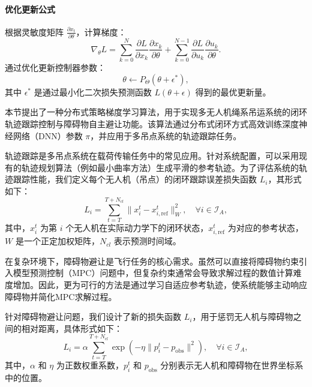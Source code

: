 \documentclass[lang=chs, degree=master, blindreview=false, winfonts=true]{yanputhesis}
\begin{document}
\paragraph{优化更新公式}  
根据灵敏度矩阵 $\frac{\partial x_t}{\partial \theta}$，计算梯度：
\begin{equation}
\nabla_\theta L = \sum_{k=0}^N \frac{\partial L}{\partial x_k} \frac{\partial x_k}{\partial \theta} + \sum_{k=0}^{N-1} \frac{\partial L}{\partial u_k} \frac{\partial u_k}{\partial \theta}.
\end{equation}
通过优化更新控制器参数：
\begin{equation}
\theta \leftarrow P_\Theta(\theta + \epsilon^*),
\end{equation}
其中 $\epsilon^*$ 是通过最小化二次损失预测函数 $L(\theta + \epsilon)$ 得到的最优更新量。

本节提出了一种分布式策略梯度学习算法，用于实现多无人机绳系吊运系统的闭环轨迹跟踪控制与障碍物自主避让功能。该算法通过分布式闭环方式高效训练深度神经网络（DNN）参数 $\pi$，并应用于多吊点系统的轨迹跟踪任务。

轨迹跟踪是多吊点系统在载荷传输任务中的常见应用。针对系统配置，可以采用现有的轨迹规划算法（例如最小曲率方法）生成平滑的参考轨迹。为了评估系统的轨迹跟踪性能，我们定义每个无人机（吊点）的闭环跟踪误差损失函数 $L_i$，其形式如下：
\begin{equation}
L_i = \sum_{t=T}^{T+N_{cl}} \| x_i^t - x_{i,\text{ref}}^t \|_W^2, \quad \forall i \in \mathcal{I}_A,  \label{28}
\end{equation}
其中，$x_i^t$ 为第 $i$ 个无人机在实际动力学下的闭环状态，$x_{i,\text{ref}}^t$ 为对应的参考状态，$W$ 是一个正定加权矩阵，$N_{cl}$ 表示预测时间域。

在复杂环境下，障碍物避让是飞行任务的核心需求。虽然可以直接将障碍物约束引入模型预测控制（MPC）问题中，但复杂约束通常会导致求解过程的数值计算难度增加。因此，更为可行的方法是通过学习自适应参考轨迹，使系统能够主动响应障碍物并简化MPC求解过程。

针对障碍物避让问题，我们设计了新的损失函数 $L_i$，用于惩罚无人机与障碍物之间的相对距离，具体形式如下：
\begin{equation}
L_i = \alpha \sum_{t=T}^{T+N_{cl}} \exp\left(-\eta \| p_i^t - p_{\text{obs}} \|^2 \right), \quad \forall i \in \mathcal{I}_A,  
\label{29}
\end{equation}
其中，$\alpha$ 和 $\eta$ 为正数权重系数，$p_i^t$ 和 $p_{\text{obs}}$ 分别表示无人机和障碍物在世界坐标系中的位置。
\end{document}
